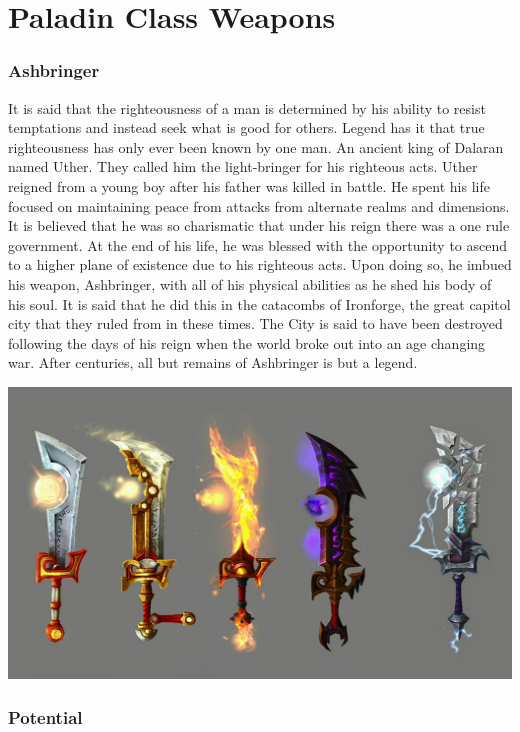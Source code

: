 \section{Paladin Class Weapons}

\subsubsection{Ashbringer}

It is said that the righteousness of a man is determined by his ability to resist temptations and instead seek what is good for others. Legend has it that true righteousness has only ever been known by one man. An ancient king of Dalaran named Uther. They called him the light-bringer for his righteous acts. Uther reigned from a young boy after his father was killed in battle. He spent his life focused on maintaining peace from attacks from alternate realms and dimensions. It is believed that he was so charismatic that under his reign there was a one rule government. At the end of his life, he was blessed with the opportunity to ascend to a higher plane of existence due to his righteous acts. Upon doing so, he imbued his weapon, Ashbringer, with all of his physical abilities as he shed his body of his soul. It is said that he did this in the catacombs of Ironforge, the great capitol city that they ruled from in these times. The City is said to have been destroyed following the days of his reign when the world broke out into an age changing war. After centuries, all but remains of Ashbringer is but a legend.

\begin{center}
	\includegraphics[width=\linewidth]{img/weapons/wowl-ashbringer.jpg}
\end{center}

\subsubsection{Potential}

